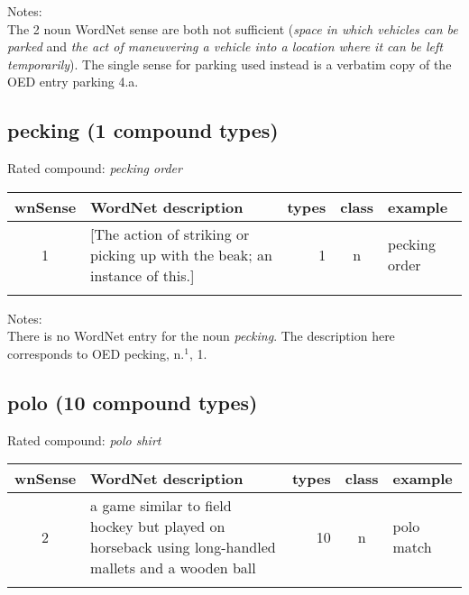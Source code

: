 \noindent
Notes:\\
The 2 noun WordNet sense are both not sufficient (\emph{space in
  which vehicles can be parked} and \emph{the act of maneuvering a
  vehicle into a location where it can be left temporarily}). The
single sense for parking used instead is a verbatim copy of the OED entry parking 4.a.

 
\subsection{pecking     (1 compound types)}
Rated compound: \emph{pecking order}


\noindent
\begin{longtable}{c>{\raggedright\arraybackslash}p{5cm}rc>{\raggedright\arraybackslash}p{2cm}}\lsptoprule
{\small wnSense}&WordNet description&types&class&example\\\midrule
1&{}[The action of striking or picking up with the beak; an instance
of this.]&1&n&pecking order\\\lspbottomrule
\end{longtable}

\noindent
Notes:\\
There is no WordNet entry for the noun \emph{pecking}. The description here
corresponds to OED pecking, n.$^1$, 1.

\subsection{polo         (10 compound types)}
Rated compound: \emph{polo shirt}


\noindent
\begin{longtable}{c>{\raggedright\arraybackslash}p{5cm}rc>{\raggedright\arraybackslash}p{2cm}}\lsptoprule
{\small wnSense}&WordNet description&types&class&example\\\midrule
2&a game similar to field hockey but played on horseback using long-handled mallets and a wooden ball&10&n&polo match\\\lspbottomrule
\end{longtable}

